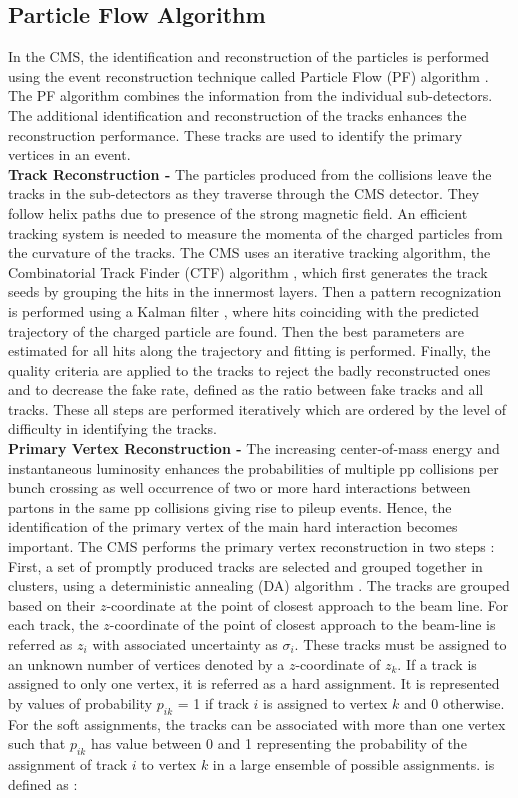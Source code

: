 \subsection{Particle Flow Algorithm}
In the CMS, the identification and reconstruction of the particles is performed using the event reconstruction technique called Particle Flow (PF) algorithm \cite{CMS:2009nxa, CMS:2010byl}. %
The PF algorithm combines the information from the individual sub-detectors. The additional identification and reconstruction of the tracks enhances the reconstruction performance. These tracks are used to identify the primary vertices in an event. \\ \newline
{\bf Track Reconstruction -} The particles produced from the collisions leave the tracks in the sub-detectors as they traverse through the CMS detector. They follow helix paths due to presence of the strong magnetic field. An efficient tracking system is needed to measure the momenta of the charged particles from the curvature of the tracks. The CMS uses an iterative tracking algorithm, the Combinatorial Track Finder (CTF) algorithm \cite{Adam:2005cg}, which first generates the track seeds by grouping the hits in the innermost layers. Then a pattern recognization is performed using a Kalman filter \cite{Fruhwirth:1987fm}, where hits coinciding with the predicted trajectory of the charged particle are found. Then the best parameters are estimated for all hits along the trajectory and fitting is performed. Finally, the quality criteria are applied to the tracks to reject the badly reconstructed ones and to decrease the fake rate, defined as the ratio between fake tracks and all tracks. These all steps are performed iteratively which are ordered by the level of difficulty in identifying the
tracks. \\ \newline
{\bf Primary Vertex Reconstruction -} The increasing center-of-mass energy and instantaneous luminosity enhances the probabilities of multiple pp collisions per bunch crossing as well occurrence of two or more hard interactions between partons in the same pp collisions giving rise to pileup events. Hence, the identification of the primary vertex of the main hard interaction becomes important. The CMS performs the primary vertex reconstruction in two steps : First, a set of promptly produced tracks are selected and grouped together in clusters, using a deterministic annealing (DA) algorithm \cite{KRose}. The tracks are grouped based on their $z$-coordinate at the point of closest approach to the beam line. For each track, the $z$-coordinate of the point of closest approach to the beam-line is referred as $z_i$ with associated uncertainty as $\sigma_i$. These tracks must be assigned to an unknown number of vertices denoted by a $z$-coordinate of $z_k$. If a track is assigned to only one vertex, it is referred as a hard assignment. It is represented by values of probability $p_{ik}$ = 1 if track $i$ is assigned to vertex $k$ and 0 otherwise. For the soft assignments, the tracks can be associated with more than one vertex such that $p_{ik}$ has value between 0 and 1 representing the probability of the assignment of track $i$ to vertex $k$ in a large ensemble of possible assignments. \chisq is defined as :
